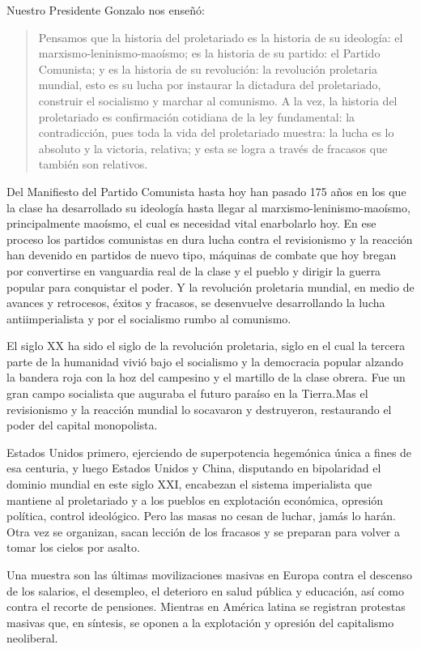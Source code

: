 \documentclass[
  a4paper,
]{article}
\begin{document}
Nuestro Presidente Gonzalo nos enseñó:

\begin{quote}
Pensamos que la historia del proletariado es la historia de su
ideología: el marxismo-leninismo-maoísmo; es la historia de su partido:
el Partido Comunista; y es la historia de su revolución: la revolución
proletaria mundial, esto es su lucha por instaurar la dictadura del
proletariado, construir el socialismo y marchar al comunismo. A la vez,
la historia del proletariado es confirmación cotidiana de la ley
fundamental: la contradicción, pues toda la vida del proletariado
muestra: la lucha es lo absoluto y la victoria, relativa; y esta se
logra a través de fracasos que también son relativos.
\end{quote}

Del Manifiesto del Partido Comunista hasta hoy han pasado 175 años en
los que la clase ha desarrollado su ideología hasta llegar al
marxismo-leninismo-maoísmo, principalmente maoísmo, el cual es necesidad
vital enarbolarlo hoy. En ese proceso los partidos comunistas en dura
lucha contra el revisionismo y la reacción han devenido en partidos de
nuevo tipo, máquinas de combate que hoy bregan por convertirse en
vanguardia real de la clase y el pueblo y dirigir la guerra popular para
conquistar el poder. Y la revolución proletaria mundial, en medio de
avances y retrocesos, éxitos y fracasos, se desenvuelve desarrollando la
lucha antiimperialista y por el socialismo rumbo al comunismo.

El siglo XX ha sido el siglo de la revolución proletaria, siglo en el
cual la tercera parte de la humanidad vivió bajo el socialismo y la
democracia popular alzando la bandera roja con la hoz del campesino y el
martillo de la clase obrera. Fue un gran campo socialista que auguraba
el futuro paraíso en la Tierra.Mas el revisionismo y la reacción mundial
lo socavaron y destruyeron, restaurando el poder del capital
monopolista.

Estados Unidos primero, ejerciendo de superpotencia hegemónica única a
fines de esa centuria, y luego Estados Unidos y China, disputando en
bipolaridad el dominio mundial en este siglo XXI, encabezan el sistema
imperialista que mantiene al proletariado y a los pueblos en explotación
económica, opresión política, control ideológico. Pero las masas no
cesan de luchar, jamás lo harán. Otra vez se organizan, sacan lección de
los fracasos y se preparan para volver a tomar los cielos por asalto.

Una muestra son las últimas movilizaciones masivas en Europa contra el
descenso de los salarios, el desempleo, el deterioro en salud pública y
educación, así como contra el recorte de pensiones. Mientras en América
latina se registran protestas masivas que, en síntesis, se oponen a la
explotación y opresión del capitalismo neoliberal.
\end{document}
